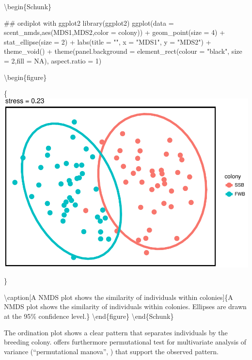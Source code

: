 \textbackslash{}begin\{Schunk\}

\begin{Sinput}
## ordiplot with ggplot2
library(ggplot2)
ggplot(data = scent_nmds,aes(MDS1,MDS2,color = colony)) +
    geom_point(size = 4) + 
    stat_ellipse(size = 2) + 
    labs(title = "", x = "MDS1", y = "MDS2") +  
    theme_void() + 
    theme(panel.background = element_rect(colour = "black", size = 2,fill = NA),
          aspect.ratio = 1)
\end{Sinput}

\textbackslash{}begin\{figure\}

\{\centering \includegraphics{ottensmann-stoffel-hoffman_files/figure-latex/unnamed-chunk-11-1}

\}

\textbackslash{}caption{[}A NMDS plot shows the similarity of
individuals within colonies{]}\{A NMDS plot shows the similarity of
individuals within colonies. Ellipses are drawn at the 95\% confidence
level.\}\label{fig:unnamed-chunk-11} \textbackslash{}end\{figure\}
\textbackslash{}end\{Schunk\}

The ordination plot shows a clear pattern that separates individuals by
the breeding colony.  offers furthermore permutational test
for multivariate analysis of variance (``permutational manova'',
\citep{Anderson.2001}) that support the observed pattern.


